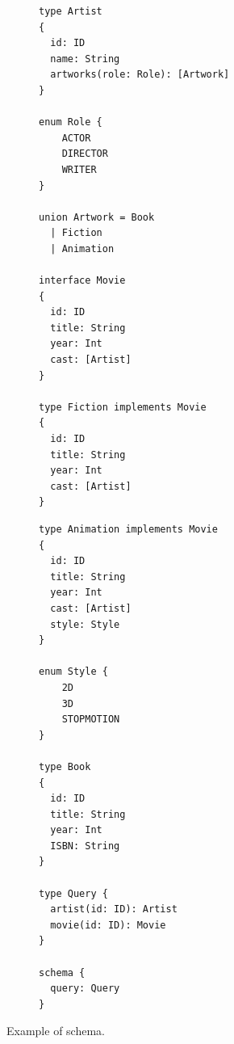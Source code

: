 \begin{figure}
    \centering
    \begin{subfigure}{.5\linewidth}
    
    \begin{verbatim}
type Artist
{
  id: ID
  name: String
  artworks(role: Role): [Artwork]
}

enum Role { 
	ACTOR
	DIRECTOR
	WRITER
}

union Artwork = Book
  | Fiction
  | Animation 

interface Movie
{
  id: ID		
  title: String
  year: Int
  cast: [Artist]
}

type Fiction implements Movie
{
  id: ID		
  title: String
  year: Int
  cast: [Artist]
}
    \end{verbatim}
    \end{subfigure}%
    \begin{subfigure}{.5\linewidth}
    \begin{verbatim}
type Animation implements Movie
{
  id: ID		
  title: String
  year: Int
  cast: [Artist]
  style: Style
}

enum Style {
	2D
	3D
	STOPMOTION
}

type Book
{
  id: ID
  title: String
  year: Int
  ISBN: String
}

type Query {
  artist(id: ID): Artist
  movie(id: ID): Movie
}

schema {
  query: Query
}
    \end{verbatim}
    \end{subfigure}
    
    \caption{Example of \gql schema.}
    \label{fig:schema_ex}
\end{figure}

